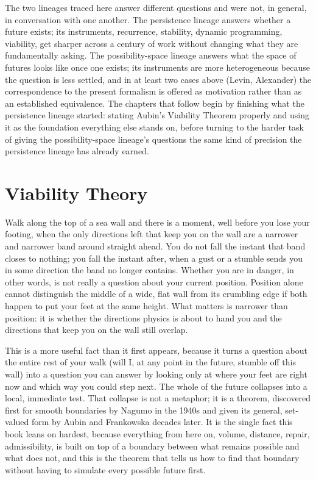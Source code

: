 \documentclass[11pt]{report}
\begin{document}
The two lineages traced here answer different questions and were not, in
general, in conversation with one another. The persistence lineage
answers whether a future exists; its instruments, recurrence,
stability, dynamic programming, viability, get sharper across a
century of work without changing what they are fundamentally asking. The
possibility-space lineage answers what the space of futures looks like
once one exists; its instruments are more heterogeneous because the
question is less settled, and in at least two cases above (Levin,
Alexander) the correspondence to the present formalism is offered as
motivation rather than as an established equivalence. The chapters that
follow begin by finishing what the persistence lineage started: stating
Aubin's Viability Theorem properly and using it as the foundation
everything else stands on, before turning to the harder task of giving
the possibility-space lineage's questions the same kind of precision
the persistence lineage has already earned.

\chapter{Viability Theory}

Walk along the top of a sea wall and there is a moment, well before you
lose your footing, when the only directions left that keep you on the
wall are a narrower and narrower band around straight ahead. You do not
fall the instant that band closes to nothing; you fall the instant
after, when a gust or a stumble sends you in some direction the band no
longer contains. Whether you are in danger, in other words, is not
really a question about your current position. Position alone cannot
distinguish the middle of a wide, flat wall from its crumbling edge if
both happen to put your feet at the same height. What matters is
narrower than position: it is whether the directions physics is about
to hand you and the directions that keep you on the wall still overlap.

This is a more useful fact than it first appears, because it turns a
question about the entire rest of your walk (will I, at any point in
the future, stumble off this wall) into a question you can answer by
looking only at where your feet are right now and which way you could
step next. The whole of the future collapses into a local, immediate
test. That collapse is not a metaphor; it is a theorem, discovered
first for smooth boundaries by Nagumo in the 1940s and given its
general, set-valued form by Aubin and Frankowska decades later. It is
the single fact this book leans on hardest, because everything from
here on, volume, distance, repair, admissibility, is built on top of a
boundary between what remains possible and what does not, and this is
the theorem that tells us how to find that boundary without having to
simulate every possible future first.
\end{document}
